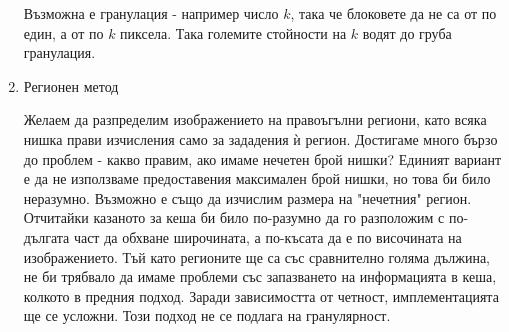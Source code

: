 \begin{Large}
\begin{enumerate}{\theenumi}{}
 
 Възможна е гранулация - например число $k$, така че блоковете да не са от по един, а от по $k$ пиксела. Така големите стойности на $k$ водят до груба гранулация.
 
 \item Регионен метод
 \par
 Желаем да разпределим изображението на правоъгълни региони, като всяка нишка прави изчисления само за зададения ѝ регион. Достигаме много бързо до проблем - какво правим, ако имаме нечетен брой нишки? Единият вариант е да не използваме предоставения максимален брой нишки, но това би било неразумно. Възможно е също да изчислим размера на "нечетния" регион. Отчитайки казаното за кеша би било по-разумно да го разположим с по-дългата част да обхване широчината, а по-късата да е по височината на изображението. Тъй като регионите ще са със сравнително голяма дължина, не би трябвало да имаме проблеми със запазването на информацията в кеша, колкото в предния подход. Заради зависимостта от четност, имплементацията ще се усложни. Този подход не се подлага на гранулярност.
 

\end{enumerate}
\end{Large}
